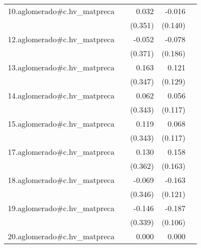 {\begin{longtable}{l*{4}{D{.}{.}{-1}}}
\addlinespace
10.aglomerado#c.hv\_matpreca&                     &       0.032         &      -0.016         &                     \\
            &                     &     (0.351)         &     (0.140)         &                     \\
\addlinespace
12.aglomerado#c.hv\_matpreca&                     &      -0.052         &      -0.078         &                     \\
            &                     &     (0.371)         &     (0.186)         &                     \\
\addlinespace
13.aglomerado#c.hv\_matpreca&                     &       0.163         &       0.121         &                     \\
            &                     &     (0.347)         &     (0.129)         &                     \\
\addlinespace
14.aglomerado#c.hv\_matpreca&                     &       0.062         &       0.056         &                     \\
            &                     &     (0.343)         &     (0.117)         &                     \\
\addlinespace
15.aglomerado#c.hv\_matpreca&                     &       0.119         &       0.068         &                     \\
            &                     &     (0.343)         &     (0.117)         &                     \\
\addlinespace
17.aglomerado#c.hv\_matpreca&                     &       0.130         &       0.158         &                     \\
            &                     &     (0.362)         &     (0.163)         &                     \\
\addlinespace
18.aglomerado#c.hv\_matpreca&                     &      -0.069         &      -0.163         &                     \\
            &                     &     (0.346)         &     (0.121)         &                     \\
\addlinespace
19.aglomerado#c.hv\_matpreca&                     &      -0.146         &      -0.187         &                     \\
            &                     &     (0.339)         &     (0.106)         &                     \\
\addlinespace
20.aglomerado#c.hv\_matpreca&                     &       0.000         &       0.000         &                     \\

\end{longtable}}
